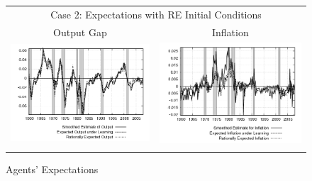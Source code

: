 \begin{figure}
\caption{Agents' Expectations}\label{fg:exp}\vspace*{1pc}\hspace*{-0.35in}
\begin{tabular}{cc}
\multicolumn{2}{c}{Case 2: Expectations with RE Initial Conditions} \\ 
Output Gap & Inflation \\
\includegraphics[scale=0.48]{results_reallinit/output_exp.png} & 
\includegraphics[scale=0.48]{results_reallinit/inflation_exp.png} \\ \\ 
 

\end{tabular}
\end{figure}
